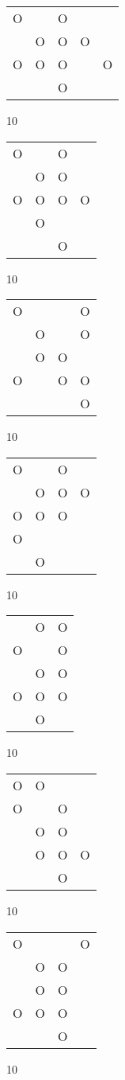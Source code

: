 \begin{tabular}{|m{0.2cm}m{0.2cm}m{0.2cm}m{0.2cm}m{0.2cm}|}\hline
O& &O& & \\
 &O&O&O& \\
O&O&O& &O\\
 & &O& & \\
\hline\end{tabular}10
\begin{tabular}{|m{0.2cm}m{0.2cm}m{0.2cm}m{0.2cm}|}\hline
O& &O& \\
 &O&O& \\
O&O&O&O\\
 &O& & \\
 & &O& \\
\hline\end{tabular}10
\begin{tabular}{|m{0.2cm}m{0.2cm}m{0.2cm}m{0.2cm}|}\hline
O& & &O\\
 &O& &O\\
 &O&O& \\
O& &O&O\\
 & & &O\\
\hline\end{tabular}10
\begin{tabular}{|m{0.2cm}m{0.2cm}m{0.2cm}m{0.2cm}|}\hline
O& &O& \\
 &O&O&O\\
O&O&O& \\
O& & & \\
 &O& & \\
\hline\end{tabular}10
\begin{tabular}{|m{0.2cm}m{0.2cm}m{0.2cm}|}\hline
 &O&O\\
O& &O\\
 &O&O\\
O&O&O\\
 &O& \\
\hline\end{tabular}10
\begin{tabular}{|m{0.2cm}m{0.2cm}m{0.2cm}m{0.2cm}|}\hline
O&O& & \\
O& &O& \\
 &O&O& \\
 &O&O&O\\
 & &O& \\
\hline\end{tabular}10
\begin{tabular}{|m{0.2cm}m{0.2cm}m{0.2cm}m{0.2cm}|}\hline
O& & &O\\
 &O&O& \\
 &O&O& \\
O&O&O& \\
 & &O& \\
\hline\end{tabular}10
